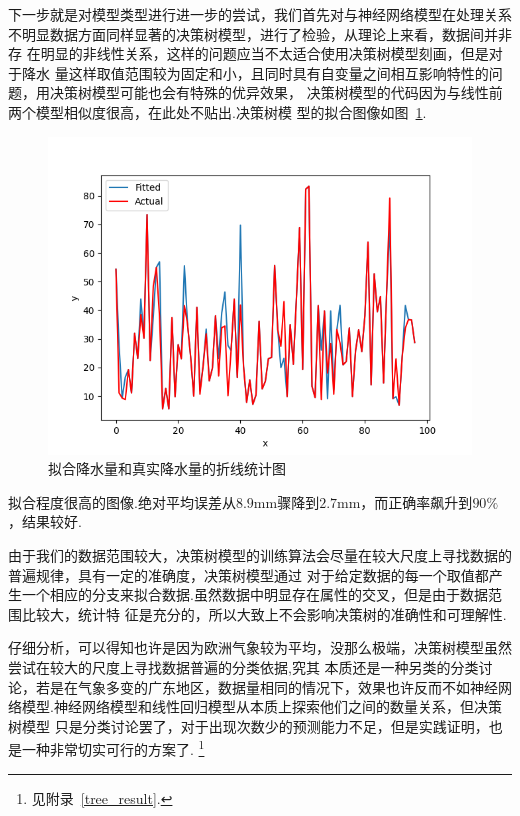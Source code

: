 \documentclass[UTF8, a4paper]{ctexart}
\begin{document}
下一步就是对模型类型进行进一步的尝试，我们首先对与神经网络模型在处理关系
不明显数据方面同样显著的决策树模型，进行了检验，从理论上来看，数据间并非存
在明显的非线性关系，这样的问题应当不太适合使用决策树模型刻画，但是对于降水
量这样取值范围较为固定和小，且同时具有自变量之间相互影响特性的问题，用决策树模型可能也会有特殊的优异效果，
决策树模型的代码因为与线性前两个模型相似度很高，在此处不贴出.决策树模
型的拟合图像如图~\textcolor{red}{\ref{pic10}}.

\begin{figure}[h!]
	\centering
	\includegraphics[scale=0.3]{very_success.png}
	\caption{拟合降水量和真实降水量的折线统计图}\label{pic10}
\end{figure}

拟合程度很高的图像.绝对平均误差从$8.9$\si{\milli\meter}骤降到$2.7$\si{\milli\meter}，而正确率飙升到$90\%$，结果较好.

由于我们的数据范围较大，决策树模型的训练算法会尽量在较大尺度上寻找数据的普遍规律，具有一定的准确度，决策树模型通过
对于给定数据的每一个取值都产生一个相应的分支来拟合数据.虽然数据中明显存在属性的交叉，但是由于数据范围比较大，统计特
征是充分的，所以大致上不会影响决策树的准确性和可理解性.

仔细分析，可以得知也许是因为欧洲气象较为平均，没那么极端，决策树模型虽然尝试在较大的尺度上寻找数据普遍的分类依据,究其
本质还是一种另类的分类讨论，若是在气象多变的广东地区，数据量相同的情况下，效果也许反而不如神经网
络模型.神经网络模型和线性回归模型从本质上探索他们之间的数量关系，但决策树模型
只是分类讨论罢了，对于出现次数少的预测能力不足，但是实践证明，也是一种非常切实可行的方案了.
\footnote{见附录~\textcolor{red}{\ref{tree_result}}.}
\end{document}
